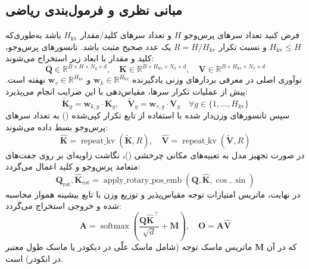 \subsection{مبانی نظری و فرمول‌بندی ریاضی}
فرض کنید تعداد سرهای پرس‌وجو $H$ و تعداد سرهای کلید/مقدار $H_{\text{kv}}$ باشد به‌طوری‌که $H_{\text{kv}} \le H$ و نسبت تکرار $R = H / H_{\text{kv}}$ یک عدد صحیح مثبت باشد. تانسورهای پرس‌وجو، کلید و مقدار با ابعاد زیر استخراج می‌شوند:
\begin{equation}
\mathbf{Q} \in \mathbb{R}^{B \times H \times N_q \times d}, \quad \mathbf{K} \in \mathbb{R}^{B \times H_{\text{kv}} \times N_k \times d}, \quad \mathbf{V} \in \mathbb{R}^{B \times H_{\text{kv}} \times N_k \times d}
\end{equation}
نوآوری اصلی  در معرفی بردارهای وزنی یادگیرنده $\mathbf{w}_k \in \mathbb{R}^{H_{\text{kv}}}$ و $\mathbf{w}_v \in \mathbb{R}^{H_{\text{kv}}}$ نهفته است. پیش از عملیات تکرار سرها، مقیاس‌دهی با این ضرایب انجام می‌پذیرد:
\begin{equation}
\tilde{\mathbf{K}}_g = \mathbf{w}_{k, g} \cdot \mathbf{K}_g, \quad \tilde{\mathbf{V}}_g = \mathbf{w}_{v, g} \cdot \mathbf{V}_g \quad \forall g \in \{1, \dots, H_{\text{kv}}\}
\end{equation}
سپس تانسورهای وزن‌دار شده با استفاده از تابع تکرار کپی‌شده () به تعداد سرهای پرس‌وجو بسط داده می‌شوند:
\begin{equation}
\hat{\mathbf{K}} = \operatorname{repeat\_kv}(\tilde{\mathbf{K}}, R), \quad \hat{\mathbf{V}} = \operatorname{repeat\_kv}(\tilde{\mathbf{V}}, R)
\end{equation}
در صورت تجهیز مدل به تعبیه‌های مکانی چرخشی ()، نگاشت زاویه‌ای بر روی جفت‌های متعامد پرس‌وجو و کلید اعمال می‌گردد:
\begin{equation}
\mathbf{Q}_{\text{rot}}, \hat{\mathbf{K}}_{\text{rot}} = \operatorname{apply\_rotary\_pos\_emb}(\mathbf{Q}, \hat{\mathbf{K}}, \cos, \sin)
\end{equation}
در نهایت، ماتریس امتیازات توجه مقیاس‌پذیر و توزیع وزن با تابع بیشینه هموار محاسبه شده و خروجی استخراج می‌گردد:
\begin{equation}
\mathbf{A} = \operatorname{softmax}\left(\frac{\mathbf{Q} \hat{\mathbf{K}}^\top}{\sqrt{d}} + \mathbf{M}\right), \quad \mathbf{O} = \mathbf{A} \hat{\mathbf{V}}
\end{equation}
که در آن $\mathbf{M}$ ماتریس ماسک توجه (شامل ماسک علّی در دیکودر یا ماسک طول معتبر در انکودر) است.

